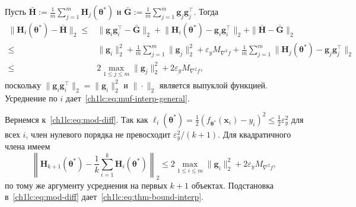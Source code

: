 Пусть $\bar{\mathbf{H}}:=\frac{1}{m}\sum_{j=1}^{m}\mathbf{H}_j(\boldsymbol{\theta}^*)$ и
$\bar{\mathbf{G}}:=\frac{1}{m}\sum_{j=1}^{m}\mathbf{g}_j\mathbf{g}_j^\top$.
Тогда
\[
\begin{array}{rl}
  \|\mathbf{H}_i(\boldsymbol{\theta}^*)-\bar{\mathbf{H}}\|_2
  \le & \|\mathbf{g}_i\mathbf{g}_i^\top-\bar{\mathbf{G}}\|_2
    + \bigl\|\mathbf{H}_i(\boldsymbol{\theta}^*)-\mathbf{g}_i\mathbf{g}_i^\top\bigr\|_2
    + \|\bar{\mathbf{H}}-\bar{\mathbf{G}}\|_2 \\
  \le & \|\mathbf{g}_i\|_2^2 + \frac{1}{m}\sum_{j=1}^{m}\|\mathbf{g}_j\|_2^2
    + \varepsilon_y M_{\nabla^2 f}
    + \frac{1}{m}\sum_{j=1}^{m}\bigl\|\mathbf{H}_j(\boldsymbol{\theta}^*)-\mathbf{g}_j\mathbf{g}_j^\top\bigr\|_2 \\
  \le & 2\max_{1\le j\le m}\|\mathbf{g}_j\|_2^2 + 2\varepsilon_y M_{\nabla^2 f},
\end{array}
\]
поскольку $\|\mathbf{g}_i\mathbf{g}_i^\top\|_2=\|\mathbf{g}_i\|_2^2$ и $\|\cdot\|_2$ является выпуклой функцией.
Усреднение по $i$ дает~\eqref{ch1lc:eq:muf-interp-general}.

Вернемся к~\eqref{ch1lc:eq:mod-diff}. Так как $\ell_i(\boldsymbol{\theta}^*)=\tfrac12(f_{\boldsymbol{\theta}^*}(\mathbf{x}_i)-y_i)^2\le \tfrac12\varepsilon_y^2$ для всех $i$,
член нулевого порядка не превосходит $\varepsilon_y^2/(k+1)$.
Для квадратичного члена имеем
\[
  \left\| \mathbf{H}_{k+1}(\boldsymbol{\theta}^*) - \frac{1}{k}\sum_{i=1}^{k}\mathbf{H}_i(\boldsymbol{\theta}^*) \right\|_2
  \le 2\max_{1\le i\le m}\|\mathbf{g}_i\|_2^2 + 2\varepsilon_y M_{\nabla^2 f},
\]
по тому же аргументу усреднения на первых $k+1$ объектах.
Подстановка в~\eqref{ch1lc:eq:mod-diff} дает~\eqref{ch1lc:eq:thm-bound-interp}.

